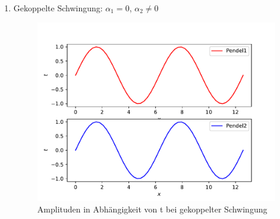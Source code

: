 \begin{enumerate}
\begin{figure}
        \label{fig:gegensinnig}
      \end{figure}
    \item Gekoppelte Schwingung: $\alpha_1=0$, $\alpha_2\neq 0$
    \begin{figure}
        \centering
        \includegraphics[scale = 0.5]{gleichsinnig.pdf}
        \caption{Amplituden in Abhängigkeit von t bei gekoppelter Schwingung}
        \label{fig:gleichsinnig}
      \end{figure}
\end{enumerate}